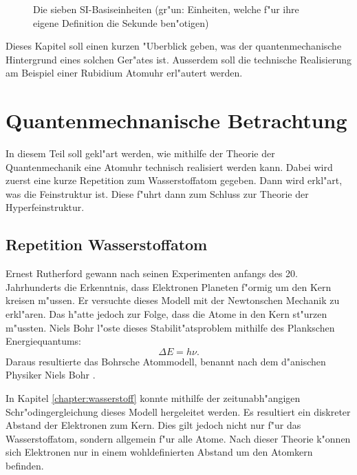 \begin{refsection}
\begin{figure}
  \caption{Die sieben SI-Basiseinheiten \cite{wiki:si} (gr"un: Einheiten, welche f"ur
    ihre eigene Definition die Sekunde ben"otigen)}
  \label{fig:siBasis}
\end{figure}

Dieses Kapitel soll einen kurzen "Uberblick geben, was der
quantenmechanische Hintergrund eines solchen Ger"ates ist. Ausserdem
soll die technische Realisierung am Beispiel einer Rubidium Atomuhr
erl"autert werden.


\section{Quantenmechnanische Betrachtung}

In diesem Teil soll gekl"art werden, wie mithilfe der Theorie der
Quantenmechanik eine Atomuhr technisch realisiert werden kann. Dabei
wird zuerst eine kurze Repetition zum Wasserstoffatom gegeben. Dann
wird erkl"art, was die Feinstruktur ist. Diese f"uhrt dann zum Schluss
zur Theorie der Hyperfeinstruktur.

\subsection{Repetition Wasserstoffatom}
Ernest Rutherford gewann nach seinen Experimenten anfangs des
20. Jahrhunderts die Erkenntnis, dass Elektronen Planeten f"ormig um
den Kern kreisen m"ussen.  Er versuchte dieses Modell mit der
Newtonschen Mechanik zu erkl"aren.  Das h"atte jedoch zur Folge, dass
die Atome in den Kern st"urzen m"ussten.  Niels Bohr l"oste dieses
Stabilit"atsproblem mithilfe des Plankschen Energiequantums:
\begin{equation}
\varDelta E = h\nu.
\end{equation}
Daraus resultierte das Bohrsche Atommodell, benannt nach dem
d"anischen Physiker Niels Bohr \cite{wiki:bohr}.

In Kapitel \ref{chapter:wasserstoff} konnte mithilfe der
zeitunabh"angigen Schr"odingergleichung dieses Modell hergeleitet
werden.  Es resultiert ein diskreter Abstand der Elektronen zum Kern.
Dies gilt jedoch nicht nur f"ur das Wasserstoffatom, sondern allgemein
f"ur alle Atome.  Nach dieser Theorie k"onnen sich Elektronen nur in
einem wohldefinierten Abstand um den Atomkern befinden.


\end{refsection}
